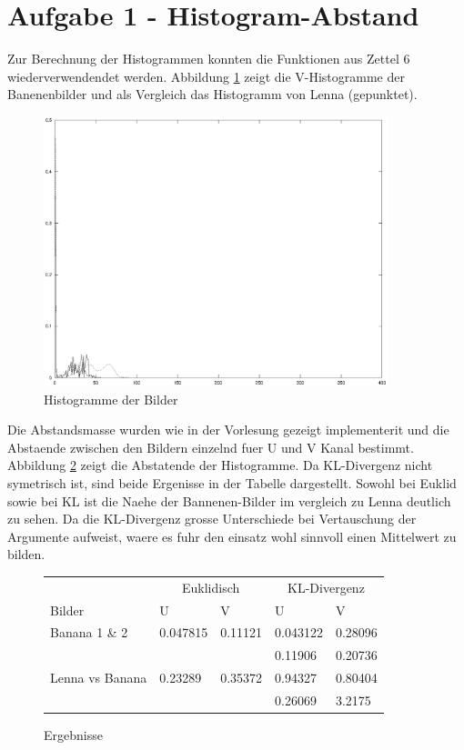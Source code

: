 



\newcommand{\nr}{6}
\lstset{language=matlab}


\section*{Aufgabe 1 - Histogram-Abstand}
Zur Berechnung der Histogrammen konnten die Funktionen aus Zettel 6 wiederverwendendet werden.
Abbildung \ref{hist} zeigt die V-Histogramme der Banenenbilder und als Vergleich das Histogramm von Lenna (gepunktet).

\begin{figure}[H]
\begin{center}
\includegraphics[width=100mm]{u09/hist.eps}
\end{center}
\label{hist}
\caption{Histogramme der Bilder}
\end{figure}

Die Abstandsmasse wurden wie in der Vorlesung gezeigt implementerit und die Abstaende zwischen den Bildern einzelnd fuer U und V Kanal bestimmt.
Abbildung \ref{dist} zeigt die Abstatende der Histogramme. Da KL-Divergenz nicht symetrisch ist, sind beide Ergenisse in der Tabelle dargestellt.
Sowohl bei Euklid sowie bei KL ist die Naehe der Bannenen-Bilder im vergleich zu Lenna deutlich zu sehen.
Da die KL-Divergenz grosse Unterschiede bei Vertauschung der Argumente aufweist, waere es fuhr den einsatz wohl sinnvoll einen Mittelwert zu bilden.

\begin{figure}[H]
\begin{center}
\begin{tabular}[h]{|l|ll|ll|}
\hline
                & \multicolumn{2}{c|}{Euklidisch} & \multicolumn{2}{c|}{KL-Divergenz} \\
Bilder          & U & V & U & V \\
\hline
Banana 1 \& 2   & 0.047815 & 0.11121 & 0.043122 & 0.28096 \\
                &          &         & 0.11906  & 0.20736 \\
Lenna vs Banana & 0.23289  & 0.35372 & 0.94327  & 0.80404 \\
                &          &         & 0.26069  & 3.2175  \\
\hline
\end{tabular}
\end{center}
\label{dist}
\caption{Ergebnisse}
\end{figure}

